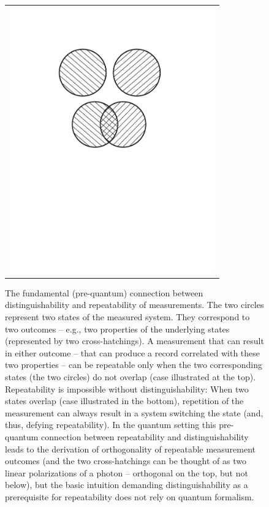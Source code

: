 \documentclass[aps,amsmath,amssymb,amsfonts,floatfix]{revtex4-1}
\newcommand{\+}         {\dagger}
\begin{document}
{\begin{figure}[tb]
\begin{tabular}{l}
\vspace{-0.15in} 
\includegraphics[width=3.5in]{CircleDiaglinesC.pdf}\\
\end{tabular}
\caption{The fundamental (pre-quantum) connection between distinguishability and repeatability of measurements. The two circles represent two states of the measured system. They correspond to two outcomes -- e.g., two properties of the underlying states (represented by two cross-hatchings). A measurement that can result in either outcome -- that can produce a record correlated with these two properties -- can be repeatable only when the two corresponding states (the two circles) do not overlap (case illustrated at the top). Repeatability is impossible without distinguishability: When two states overlap (case illustrated in the bottom), repetition of the measurement can always result in a system switching the state (and, thus, defying repeatability).
In the quantum setting this pre-quantum connection between repeatability and distinguishability leads to the derivation of orthogonality of repeatable measurement outcomes (and the two cross-hatchings can be thought of as two linear polarizations of a photon -- orthogonal on the top, but not below), but the basic intuition demanding distinguishability as a prerequisite for repeatability does not rely on quantum formalism.}
\label{Distinguishability}
\end{figure}

}
\end{document}
